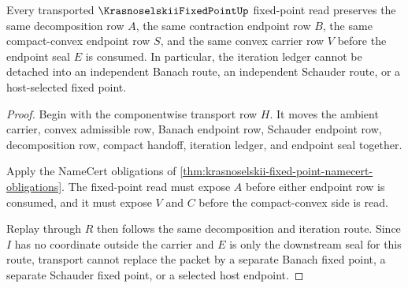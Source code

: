 \begin{theorem}
\label{thm:krasnoselskii-fixed-point-iteration-stability}
Every transported $\KrasnoselskiiFixedPointUp$ fixed-point read preserves the
same decomposition row $A$, the same contraction endpoint row $B$, the same
compact-convex endpoint row $S$, and the same convex carrier row $V$ before the
endpoint seal $E$ is consumed. In particular, the iteration ledger cannot be
detached into an independent Banach route, an independent Schauder route, or a
host-selected fixed point.
\end{theorem}
\begin{proof}
Begin with the componentwise transport row $H$. It moves the ambient carrier,
convex admissible row, Banach endpoint row, Schauder endpoint row,
decomposition row, compact handoff, iteration ledger, and endpoint seal
together.

Apply the NameCert obligations of
\autoref{thm:krasnoselskii-fixed-point-namecert-obligations}. The fixed-point
read must expose $A$ before either endpoint row is consumed, and it must expose
$V$ and $C$ before the compact-convex side is read.

Replay through $R$ then follows the same decomposition and iteration route.
Since $I$ has no coordinate outside the carrier and $E$ is only the downstream
seal for this route, transport cannot replace the packet by a separate Banach
fixed point, a separate Schauder fixed point, or a selected host endpoint.
\end{proof}




